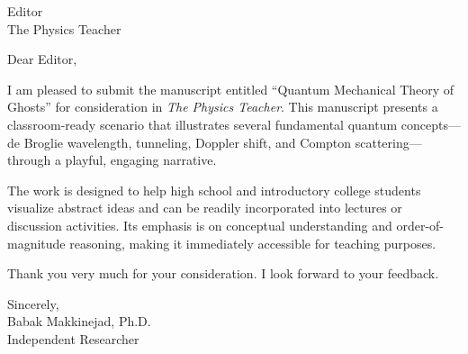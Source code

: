 \documentclass[12pt]{letter}
\begin{document}
\begin{letter}{Editor\\
The Physics Teacher}

\opening{Dear Editor,}

I am pleased to submit the manuscript entitled ``Quantum Mechanical Theory of Ghosts'' for consideration in \emph{The Physics Teacher}. This manuscript presents a classroom-ready scenario that illustrates several fundamental quantum concepts—de Broglie wavelength, tunneling, Doppler shift, and Compton scattering—through a playful, engaging narrative. 

The work is designed to help high school and introductory college students visualize abstract ideas and can be readily incorporated into lectures or discussion activities. Its emphasis is on conceptual understanding and order-of-magnitude reasoning, making it immediately accessible for teaching purposes.

Thank you very much for your consideration. I look forward to your feedback.

\closing{Sincerely,\\[2ex]%
Babak Makkinejad, Ph.D.\\
Independent Researcher}

\end{letter}
\end{document}
